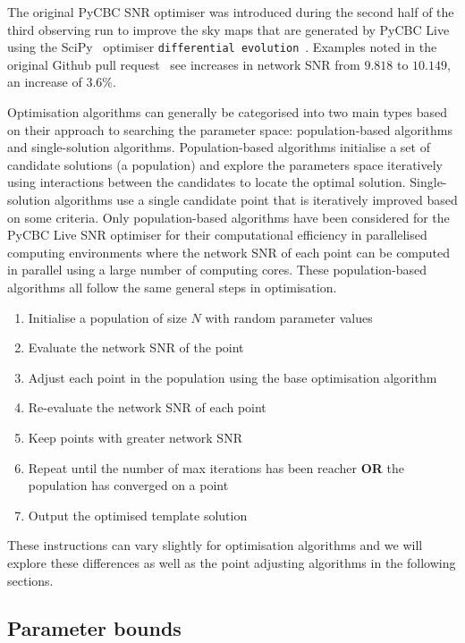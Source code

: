 The original PyCBC SNR optimiser was introduced during the second half of the third observing run to improve the sky maps that are generated by PyCBC Live using the SciPy~\cite{SciPy:2020} optimiser \texttt{differential evolution}~\cite{DE:1997}. Examples noted in the original Github pull request~\cite{pycbc_pull_request_2659} see increases in network SNR from $9.818$ to $10.149$, an increase of $3.6\%$.

Optimisation algorithms can generally be categorised into two main types based on their approach to searching the parameter space: population-based algorithms and single-solution algorithms. Population-based algorithms initialise a set of candidate solutions (a population) and explore the parameters space iteratively using interactions between the candidates to locate the optimal solution. Single-solution algorithms use a single candidate point that is iteratively improved based on some criteria. Only population-based algorithms have been considered for the PyCBC Live SNR optimiser for their computational efficiency in parallelised computing environments where the network SNR of each point can be computed in parallel using a large number of computing cores. These population-based algorithms all follow the same general steps in optimisation.
%
\begin{enumerate}
    \item Initialise a population of size $N$ with random parameter values
    \item Evaluate the network SNR of the point
    \item Adjust each point in the population using the base optimisation algorithm
    \item Re-evaluate the network SNR of each point
    \item Keep points with greater network SNR
    \item Repeat until the number of max iterations has been reacher \textbf{OR} the population has converged on a point
    \item Output the optimised template solution
\end{enumerate}
%
These instructions can vary slightly for optimisation algorithms and we will explore these differences as well as the point adjusting algorithms in the following sections.

\subsection{\label{7:sec:original_bounds}Parameter bounds}

